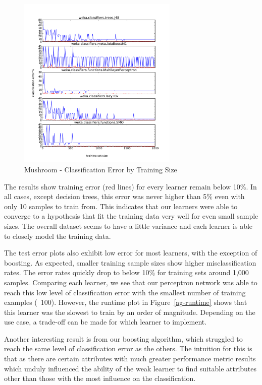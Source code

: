 \documentclass{sig-alternate}
\begin{document}
\begin{figure}[!htbp]
    \centering
    \includegraphics[width=3in]{data/agaricus-lepiota/learning-curve-10to2000/stacked-test-error.pdf}
    \caption{Mushroom - Classification Error by Training Size \label{ag-error}}
\end{figure} 

The results show training error (red lines) for every learner remain below 10\%. In all cases, except decision trees, this error was never higher than 5\% even with only 10 samples to train from. This indicates that our learners were able to converge to a hypothesis that fit the training data very well for even small sample sizes. The overall dataset seems to have a little variance and each learner is able to closely model the training data.

The test error plots also exhibit low error for most learners, with the exception of boosting. As expected, smaller training sample sizes show higher misclassification rates. The error rates quickly drop to below 10\% for training sets around 1,000 samples. Comparing each learner, we see that our perceptron network was able to reach this low level of classification error with the smallest number of training examples (~100). However, the runtime plot in Figure~\ref{ag-runtime} shows that this learner was the slowest to train by an order of magnitude. Depending on the use case, a trade-off can be made for which learner to implement.

Another interesting result is from our boosting algorithm, which struggled to reach the same level of classification error as the others. The intuition for this is that as there are certain attributes with much greater performance metric results which unduly influenced the ability of the weak learner to find suitable attributes other than those with the most influence on the classification.
\end{document}
